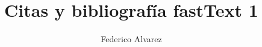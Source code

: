 \documentclass[authoryear,a4paper, 12pt]{scrartcl}
\title{Citas y bibliografía fastText 1}
\author{Federico Alvarez}
\begin{document}
\maketitle

\citep{AlmeidaXexeo}
\citep{manning2008}
\citep{axler15}
\citet{firth57}
\citep{dumais1988}
\citet{mikolov2013}
\citep{joulin2016bag, bojanowski16}
\citet{bhattacharjee2017}



\end{document}
